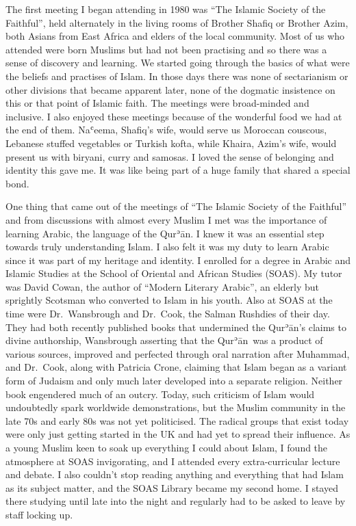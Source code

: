 \documentclass[12pt]{memoir}
\def\´{ʾ} %
\def\`{ʿ} %
\newcommand{\cor}[2]{#2} %
\def \Quran{Qur\-\´ān} %
\begin{document}
The first meeting I began attending in 1980 was
“The Islamic Society of the Faithful”,
held alternately in the living rooms of Brother Shafiq or Brother Azim,
both Asians from East Africa and elders of the local community.
Most of us who attended were born Muslims but had not been practising
and so there was a sense of discovery and learning.
We started going through the basics of what were the beliefs
and practises of Islam.
In those days there was none of \cor{the sectarian}{sectarianism}
or other divisions that became apparent later,
none of the dogmatic insistence on this or that point of Islamic faith.
The meetings were broad-minded and inclusive.
I also enjoyed these meetings because of the wonderful food
we had at the end of them.
Na\`eema, Shafiq’s wife, would serve us Moroccan \cor{cous cous}{couscous},
Lebanese stuffed vegetables or Turkish kofta, while Khaira, Azim’s wife,
would present us with \cor{biriyani}{biryani}, curry and samosas.
I loved the sense of belonging and identity this gave me.
It was like being part of a huge family that shared a special bond.

One thing that came out of the meetings of
“The Islamic Society of the Faithful”
and from discussions with almost every Muslim I met
was the importance of learning Arabic, the language of the \Quran.
I knew it was an essential step towards truly understanding Islam.
I also felt it was my duty to learn Arabic
since it was part of my heritage and identity.
I enrolled for a degree in Arabic and Islamic Studies
at the School of Oriental and African Studies (SOAS).
My tutor was David Cowan, the author of “Modern Literary Arabic”,
an elderly but sprightly Scotsman who converted to Islam in his youth.
Also at SOAS at the time were Dr.\ Wansbrough and Dr.\ Cook,
the Salman Rushdies of their day.
They had both recently published books that undermined
the \Quran’s claims to divine authorship,
Wansbrough asserting that the \Quran\ was a product of various sources,
improved and perfected through oral narration after Muhammad,
and Dr.\ Cook, along with Patricia Crone,
claiming that Islam began as a variant form of Judaism
and only much later developed into a separate religion.
Neither book engendered much of an outcry.
Today, such criticism of Islam would undoubtedly
spark worldwide demonstrations,
but the Muslim community in the late 70s and early 80s was not yet politicised.
The radical groups that exist today were only just getting started in the UK
and had yet to spread their influence.
As a young Muslim keen to soak up everything I could about Islam,
I found the atmosphere at SOAS invigorating,
and I attended every extra-curricular lecture and debate.
I also couldn’t stop reading anything
and everything that had Islam as its subject matter,
and the SOAS Library became my second home.
I stayed there studying until late into the night
and regularly had to be asked to leave by staff locking up.
\end{document}
